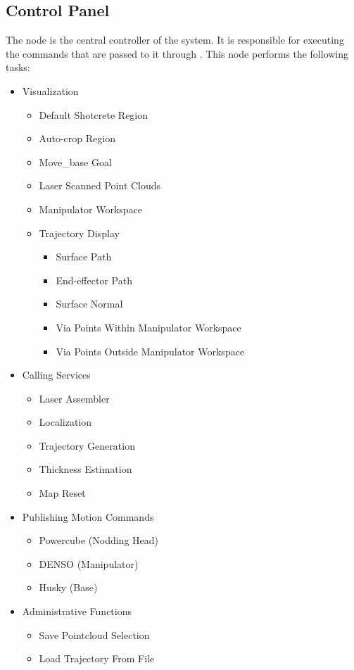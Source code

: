 \subsection{Control Panel}
The  node is the central controller of the system. It is responsible for executing the commands that are passed to it through . This node performs the following tasks:
\begin{itemize}
\item Visualization
\begin{itemize}
\item Default Shotcrete Region
\item Auto-crop Region
\item Move\_base Goal
\item Laser Scanned Point Clouds
\item Manipulator Workspace
\item Trajectory Display
\begin{itemize}
\item Surface Path
\item End-effector Path
\item Surface Normal
\item Via Points Within Manipulator Workspace
\item Via Points Outside Manipulator Workspace
\end{itemize}
\end{itemize}
\item Calling Services
\begin{itemize}
\item Laser Assembler
\item Localization
\item Trajectory Generation
\item Thickness Estimation
\item Map Reset
\end{itemize}
\item Publishing Motion Commands
\begin{itemize}
\item Powercube (Nodding Head)
\item DENSO (Manipulator)
\item Husky (Base)
\end{itemize}
\item Administrative Functions
\begin{itemize}
\item Save Pointcloud Selection
\item Load Trajectory From File

\end{itemize}
\end{itemize}
